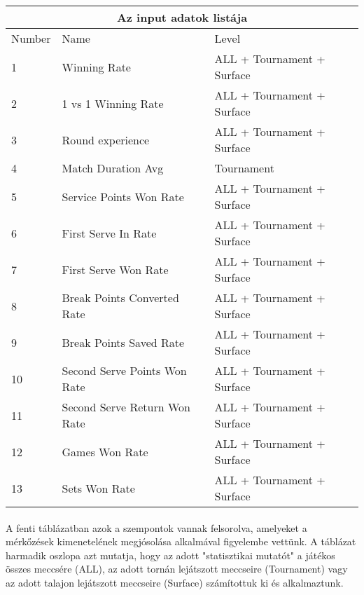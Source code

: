 \begin{tabular}{ |p{2cm}||p{6cm}|p{6cm}|  }
 \hline
 \multicolumn{3}{|c|}{Az input adatok listája} \\
 \hline
  Number & Name & Level \\
 \hline
 1   & Winning Rate                  & ALL + Tournament + Surface \\
 2   & 1 vs 1 Winning Rate           & ALL + Tournament + Surface \\
 3   & Round experience              & ALL + Tournament + Surface \\
 4   & Match Duration Avg            & Tournament  \\
 5   & Service Points Won Rate       & ALL + Tournament + Surface \\
 6   & First Serve In Rate           & ALL + Tournament + Surface \\
 7   & First Serve Won Rate          & ALL + Tournament + Surface \\
 8   & Break Points Converted Rate   & ALL + Tournament + Surface \\
 9   & Break Points Saved Rate       & ALL + Tournament + Surface \\
 10  & Second Serve Points Won Rate  & ALL + Tournament + Surface \\
 11  & Second Serve Return Won Rate  & ALL + Tournament + Surface \\
 12  & Games Won Rate                & ALL + Tournament + Surface \\
 13  & Sets Won Rate                 & ALL + Tournament + Surface \\
 \hline
\end{tabular}

\paragraph{}
A fenti táblázatban azok a szempontok vannak  felsorolva, amelyeket a mérkőzések kimenetelének megjósolása alkalmával figyelembe vettünk. A táblázat harmadik oszlopa azt mutatja, hogy az adott "statisztikai mutatót" a játékos összes meccsére (ALL), az adott tornán lejátszott meccseire (Tournament) vagy az adott talajon lejátszott meccseire (Surface) számítottuk ki és alkalmaztunk.

